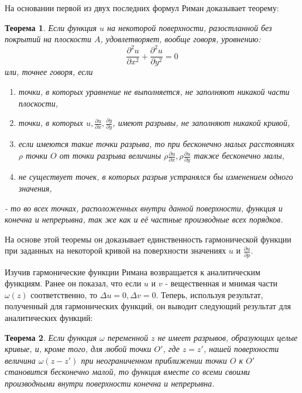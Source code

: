 \documentclass[a4paper,12pt]{article}
\newtheorem*{theorem}{Теорема}
\theoremstyle{remark}
\begin{document}
На основании первой из двух последних формул Риман доказывает теорему:
\begin{theorem}
  Если функция $u$ на некоторой поверхности, разостланной без покрытий на плоскости $A$, удовлетворяет, вообще говоря, уровнению:
  \begin{equation}
    \dfrac{\partial ^2 u}{\partial x ^2} + \dfrac{\partial ^2 u}{\partial y ^2} = 0
  \end{equation}
  или, точнее говоря, если
  \begin{enumerate}
    \item точки, в которых уравнение не выполняется, не заполняют никакой части плоскости,
    \item точки, в которых $u, \frac{\partial u}{\partial x}, \frac{\partial y}{\partial y}$, имеют разрывы, не заполняют никакой кривой,
    \item если имеются такие точки разрыва, то при бесконечно малых расстояниях $\rho$ точки $O$
          от точки разрыва величины $\rho \frac{\partial u}{\partial x}, \rho \frac{\partial u}{\partial y}$
          также бесконечно малы,
    \item не существует точек, в которых разрыв устранялся бы изменением одного значения,
  \end{enumerate}
  - то во всех точках, расположенных внутри данной поверхности, функция и конечна и
  непрерывна, так же как и её частные производные всех порядков.
\end{theorem}

На основе этой теоремы он доказывает единственность гармонической функции при заданных на некоторой кривой на поверхности значениях $u$ и $\frac{\partial u}{\partial p}$.

Изучив гармонические функции Римана возвращается к аналитическим функциям. Ранее он
показал, что если $u$ и $v$ - вещественная и мнимая части $\omega(z)$ соответственно, то $\Delta u = 0, \Delta v = 0$.
Теперь, используя результат, полученный для гармонических функций, он выводит следующий результат для аналитических функций:

\begin{theorem}
  Если функция $\omega$ переменной $z$ не имеет разрывов, образующих целые кривые,
  и, кроме того, для любой точки $O'$, где $z = z'$, нашей поверхности величина $\omega(z - z')$ при
  неограниченном приближении точки $O$ к $O'$ становится бесконечно малой, то функция
  вместе со всеми своими производными внутри поверхности конечна и непрерывна.
\end{theorem}
\end{document}
